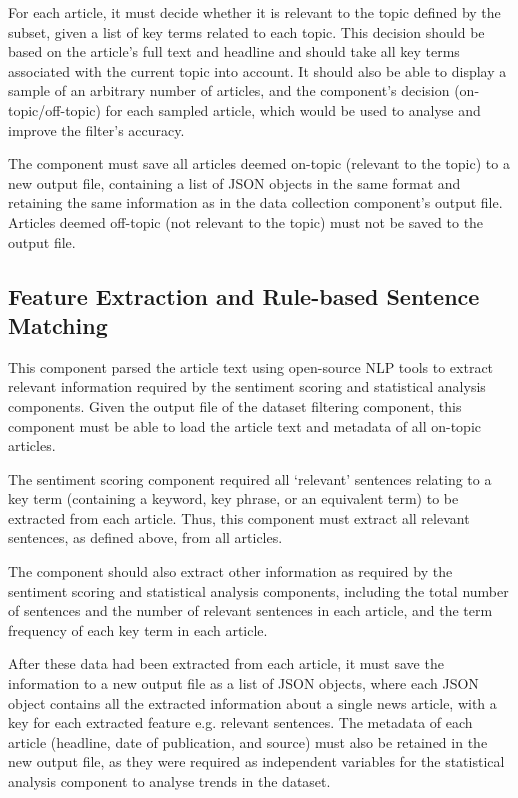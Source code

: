 \documentclass{report}
\begin{document}
For each article, it must decide whether it is relevant to the topic defined by the subset, given a list of key terms related to each topic.
This decision should be based on the article's full text and headline and should take all key terms associated with the current topic into account.
It should also be able to display a sample of an arbitrary number of articles, and the component's decision (on-topic/off-topic) for each sampled article, which would be used to analyse and improve the filter's accuracy.

The component must save all articles deemed on-topic (relevant to the topic) to a new output file, containing a list of JSON objects in the same format and retaining the same information as in the data collection component's output file.
Articles deemed off-topic (not relevant to the topic) must not be saved to the output file.

\subsection{Feature Extraction and Rule-based Sentence Matching} \label{req-matching}

This component parsed the article text using open-source NLP tools to extract relevant information required by the sentiment scoring and statistical analysis components.
Given the output file of the dataset filtering component, this component must be able to load the article text and metadata of all on-topic articles.

The sentiment scoring component required all `relevant' sentences relating to a key term (containing a keyword, key phrase, or an equivalent term) to be extracted from each article.
Thus, this component must extract all relevant sentences, as defined above, from all articles.

The component should also extract other information as required by the sentiment scoring and statistical analysis components, including the total number of sentences and the number of relevant sentences in each article, and the term frequency of each key term in each article.

After these data had been extracted from each article, it must save the information to a new output file as a list of JSON objects, where each JSON object contains all the extracted information about a single news article, with a key for each extracted feature e.g. relevant sentences.
The metadata of each article (headline, date of publication, and source) must also be retained in the new output file, as they were required as independent variables for the statistical analysis component to analyse trends in the dataset.
\end{document}
